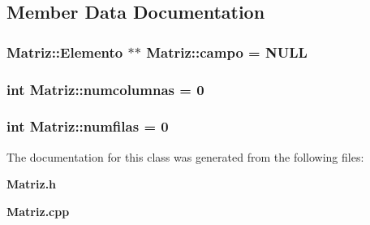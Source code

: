 \subsection{Member Data Documentation}
\subsubsection[{campo}]{\setlength{\rightskip}{0pt plus 5cm}Matriz\-::\-Elemento $\ast$$\ast$ Matriz\-::campo = N\-U\-L\-L\hspace{0.3cm}{\ttfamily [static]}}\label{class_matriz_a032ccdc0809d49523ffb99cba18d521e}
\subsubsection[{numcolumnas}]{\setlength{\rightskip}{0pt plus 5cm}int Matriz\-::numcolumnas = 0\hspace{0.3cm}{\ttfamily [static]}}\label{class_matriz_a3d97ee57664483d8ffce52aa9360d37b}
\subsubsection[{numfilas}]{\setlength{\rightskip}{0pt plus 5cm}int Matriz\-::numfilas = 0\hspace{0.3cm}{\ttfamily [static]}}\label{class_matriz_a2df02e4f2af8f0bf765e24d7bc9ca475}


The documentation for this class was generated from the following files\-:\begin{DoxyCompactItemize}
\item 
{\bf Matriz.\-h}\item 
{\bf Matriz.\-cpp}\end{DoxyCompactItemize}
